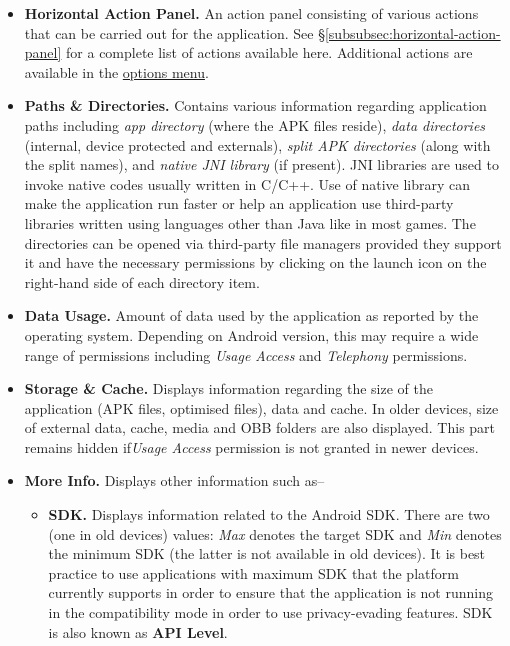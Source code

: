 \begin{itemize}
    \item \textbf{Horizontal Action Panel.} An action panel consisting of various actions that can be carried out for
    the application. See §\ref{subsubsec:horizontal-action-panel} for a complete list of actions available here.
    Additional actions are available in the \hyperref[subsubsec:app-info-options-menu]{options menu}.

    \item \textbf{Paths \& Directories.} Contains various information regarding application paths including \textit{app
    directory} (where the APK files reside), \textit{data directories} (internal, device protected and externals),
    \textit{split APK directories} (along with the split names), and \textit{native JNI library} (if present). JNI
    libraries are used to invoke native codes usually written in C/C++. Use of native library can make the application
    run faster or help an application use third-party libraries written using languages other than Java like in most
    games. The directories can be opened via third-party file managers provided they support it and have the necessary
    permissions by clicking on the launch icon on the right-hand side of each directory item.

    \item \textbf{Data Usage.} Amount of data used by the application as reported by the operating system. Depending on
    Android version, this may require a wide range of permissions including \textit{Usage Access} and \textit{Telephony}
    permissions.

    \item \textbf{Storage \& Cache.} Displays information regarding the size of the application (APK files, optimised
    files), data and cache. In older devices, size of external data, cache, media and OBB folders are also displayed.
    This part remains hidden if\textit{Usage Access} permission is not granted in newer devices.

    \item \textbf{More Info.} Displays other information such as--
    \begin{itemize}
        \item \textbf{SDK.} Displays information related to the Android SDK. There are two (one in old devices) values:
        \textit{Max} denotes the target SDK and \textit{Min} denotes the minimum SDK (the latter is not available in old
        devices). It is best practice to use applications with maximum SDK that the platform currently supports in order
        to ensure that the application is not running in the compatibility mode in order to use privacy-evading features.
        SDK is also known as \textbf{API Level}.


\end{itemize}
\end{itemize}
